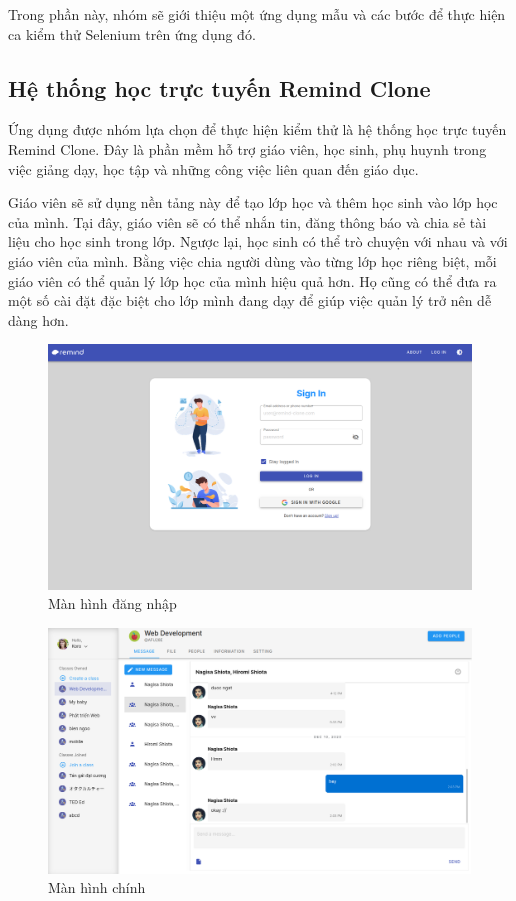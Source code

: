 \documentclass[./../main_file.tex]{subfiles}
\begin{document}
	Trong phần này, nhóm sẽ giới thiệu một ứng dụng mẫu và các bước để thực hiện ca kiểm thử Selenium trên ứng dụng đó.
	
	\subsection{Hệ thống học trực tuyến Remind Clone}
	
	Ứng dụng được nhóm lựa chọn để thực hiện kiểm thử là hệ thống học trực tuyến Remind Clone. Đây là phần mềm hỗ trợ giáo viên, học sinh, phụ huynh trong việc giảng dạy, học tập và những công việc liên quan đến giáo dục. 
	
	Giáo viên sẽ sử dụng nền tảng này để tạo lớp học và thêm học sinh vào lớp học của mình. Tại đây, giáo viên sẽ có thể nhắn tin, đăng thông báo và chia sẻ tài liệu cho học sinh trong lớp. Ngược lại, học sinh có thể trò chuyện với nhau và với giáo viên của mình. Bằng việc chia người dùng vào từng lớp học riêng biệt, mỗi giáo viên có thể quản lý lớp học của mình hiệu quả hơn. Họ cũng có thể đưa ra một số cài đặt đặc biệt cho lớp mình đang dạy để giúp việc quản lý trở nên dễ dàng hơn.
	
	\begin{figure}[H]
		\centering
		\includegraphics[width=\linewidth]{./images/image4.png}
		\caption{Màn hình đăng nhập}
	\end{figure}

	\begin{figure}\centering
		\includegraphics[width=\linewidth]{./images/image2.png}
		\caption{Màn hình chính}
	\end{figure}
	
\end{document}
